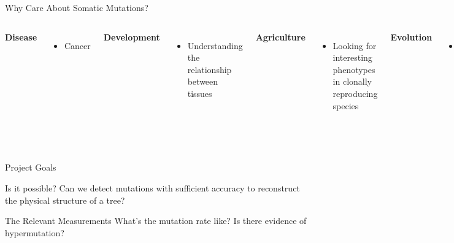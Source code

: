 \documentclass{beamer}
\begin{document}
\begin{frame}{Why Care About Somatic Mutations?}
\begin{columns}

\textbf{Disease}
\begin{itemize}
\item Cancer
\end{itemize}

\vfill

\textbf{Development}
\begin{itemize}
\item Understanding the relationship between tissues
\end{itemize}

\vfill

\textbf{Agriculture}
\begin{itemize}
\item Looking for interesting phenotypes in clonally reproducing species
\end{itemize}

\textbf{Evolution}
\begin{itemize}
\item Determining the relationship between somatic and germline mutation rate
\end{itemize}

\includegraphics[width=\linewidth]{nectarine.jpg}

\end{columns}
\end{frame}

\begin{frame}{Project Goals}

\begin{block}{Is it possible?}
Can we detect mutations with sufficient accuracy to reconstruct the physical structure of a tree?
\end{block}

\begin{exampleblock}{The Relevant Measurements}
What's the mutation rate like? Is there evidence of hypermutation?
\end{exampleblock}

\end{frame}
\end{document}
